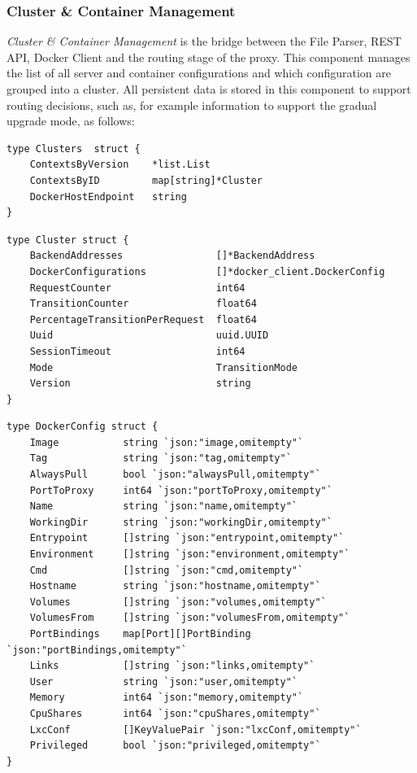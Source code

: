 \documentclass[a4paper,11pt,twoside]{report}
\begin{document}
\subsubsection*{Cluster \& Container Management}
\textit{Cluster \& Container Management} is the bridge between the File Parser, REST API, Docker Client and the routing stage of the proxy.  This component manages the list of all server and container configurations and which configuration are grouped into a cluster.  All persistent data is stored in this component to support routing decisions, such as, for example information to support the gradual upgrade mode, as follows: \bigskip  

\begin{lstlisting}[language=terminal]
type Clusters  struct {
	ContextsByVersion    *list.List
	ContextsByID         map[string]*Cluster
	DockerHostEndpoint   string
}
\end{lstlisting}

\begin{lstlisting}[language=terminal]
type Cluster struct {
	BackendAddresses                []*BackendAddress
	DockerConfigurations            []*docker_client.DockerConfig
	RequestCounter                  int64
	TransitionCounter               float64
	PercentageTransitionPerRequest  float64
	Uuid                            uuid.UUID
	SessionTimeout                  int64
	Mode                            TransitionMode
	Version                         string
}
\end{lstlisting}

\begin{lstlisting}[language=terminal]
type DockerConfig struct {
	Image           string `json:"image,omitempty"`
	Tag             string `json:"tag,omitempty"`
	AlwaysPull      bool `json:"alwaysPull,omitempty"`
	PortToProxy     int64 `json:"portToProxy,omitempty"`
	Name            string `json:"name,omitempty"`
	WorkingDir      string `json:"workingDir,omitempty"`
	Entrypoint      []string `json:"entrypoint,omitempty"`
	Environment     []string `json:"environment,omitempty"`
	Cmd             []string `json:"cmd,omitempty"`
	Hostname        string `json:"hostname,omitempty"`
	Volumes         []string `json:"volumes,omitempty"`
	VolumesFrom     []string `json:"volumesFrom,omitempty"`
	PortBindings    map[Port][]PortBinding `json:"portBindings,omitempty"`
	Links           []string `json:"links,omitempty"`
	User            string `json:"user,omitempty"`
	Memory          int64 `json:"memory,omitempty"`
	CpuShares       int64 `json:"cpuShares,omitempty"`
	LxcConf         []KeyValuePair `json:"lxcConf,omitempty"`
	Privileged      bool `json:"privileged,omitempty"`
}
\end{lstlisting} 
\end{document}
